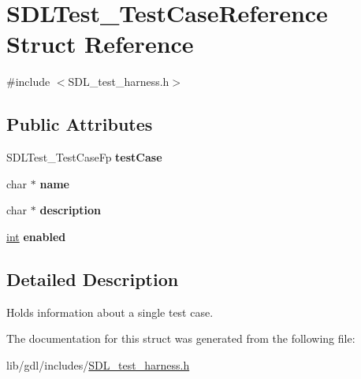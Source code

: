 \hypertarget{struct_s_d_l_test___test_case_reference}{}\section{S\+D\+L\+Test\+\_\+\+Test\+Case\+Reference Struct Reference}
\label{struct_s_d_l_test___test_case_reference}


{\ttfamily \#include $<$S\+D\+L\+\_\+test\+\_\+harness.\+h$>$}

\subsection*{Public Attributes}
\begin{DoxyCompactItemize}
\item 
\hypertarget{struct_s_d_l_test___test_case_reference_af9472f0c421a2845b540fc28fb30a3ef}{}S\+D\+L\+Test\+\_\+\+Test\+Case\+Fp {\bfseries test\+Case}\label{struct_s_d_l_test___test_case_reference_af9472f0c421a2845b540fc28fb30a3ef}

\item 
\hypertarget{struct_s_d_l_test___test_case_reference_aabd588c915c52fb13bcd0c71e071a604}{}char $\ast$ {\bfseries name}\label{struct_s_d_l_test___test_case_reference_aabd588c915c52fb13bcd0c71e071a604}

\item 
\hypertarget{struct_s_d_l_test___test_case_reference_a1ee6c8a2529fdfcd62bb1483c26be67d}{}char $\ast$ {\bfseries description}\label{struct_s_d_l_test___test_case_reference_a1ee6c8a2529fdfcd62bb1483c26be67d}

\item 
\hypertarget{struct_s_d_l_test___test_case_reference_a15168c85e38cae7557b4beb477ef6f9a}{}\hyperlink{_s_d_l__thread_8h_a6a64f9be4433e4de6e2f2f548cf3c08e}{int} {\bfseries enabled}\label{struct_s_d_l_test___test_case_reference_a15168c85e38cae7557b4beb477ef6f9a}

\end{DoxyCompactItemize}


\subsection{Detailed Description}
Holds information about a single test case. 

The documentation for this struct was generated from the following file\+:\begin{DoxyCompactItemize}
\item 
lib/gdl/includes/\hyperlink{_s_d_l__test__harness_8h}{S\+D\+L\+\_\+test\+\_\+harness.\+h}\end{DoxyCompactItemize}
